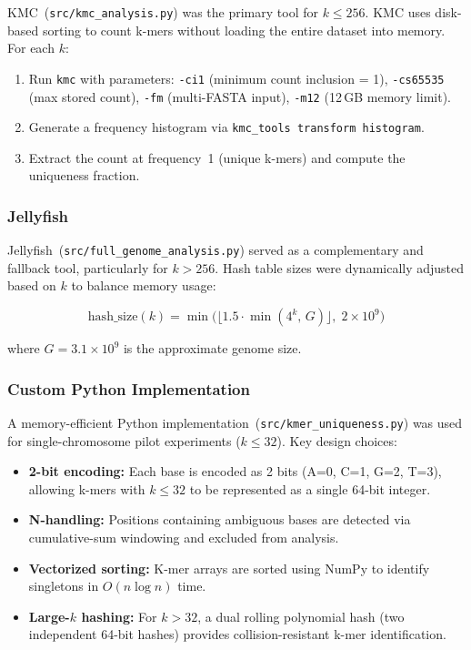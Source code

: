 \documentclass[11pt,a4paper]{article}
\begin{document}
KMC~(\texttt{src/kmc\_analysis.py}) was the primary tool for $k \leq 256$. KMC uses disk-based sorting to count k-mers without loading the entire dataset into memory. For each $k$:

\begin{enumerate}
    \item Run \texttt{kmc} with parameters: \texttt{-ci1} (minimum count inclusion = 1), \texttt{-cs65535} (max stored count), \texttt{-fm} (multi-FASTA input), \texttt{-m12} (12\,GB memory limit).
    \item Generate a frequency histogram via \texttt{kmc\_tools transform histogram}.
    \item Extract the count at frequency~1 (unique k-mers) and compute the uniqueness fraction.
\end{enumerate}

\subsubsection{Jellyfish}

Jellyfish~(\texttt{src/full\_genome\_analysis.py}) served as a complementary and fallback tool, particularly for $k > 256$. Hash table sizes were dynamically adjusted based on $k$ to balance memory usage:

\[
\text{hash\_size}(k) = \min\!\Big(\lfloor 1.5 \cdot \min(4^k,\, G)\rfloor,\; 2 \times 10^9\Big)
\]

where $G = 3.1 \times 10^9$ is the approximate genome size.

\subsubsection{Custom Python Implementation}

A memory-efficient Python implementation~(\texttt{src/kmer\_uniqueness.py}) was used for single-chromosome pilot experiments ($k \leq 32$). Key design choices:

\begin{itemize}
    \item \textbf{2-bit encoding:} Each base is encoded as 2 bits (A=0, C=1, G=2, T=3), allowing k-mers with $k \leq 32$ to be represented as a single 64-bit integer.
    \item \textbf{N-handling:} Positions containing ambiguous bases are detected via cumulative-sum windowing and excluded from analysis.
    \item \textbf{Vectorized sorting:} K-mer arrays are sorted using NumPy to identify singletons in $O(n \log n)$ time.
    \item \textbf{Large-$k$ hashing:} For $k > 32$, a dual rolling polynomial hash (two independent 64-bit hashes) provides collision-resistant k-mer identification.
\end{itemize}
\end{document}
